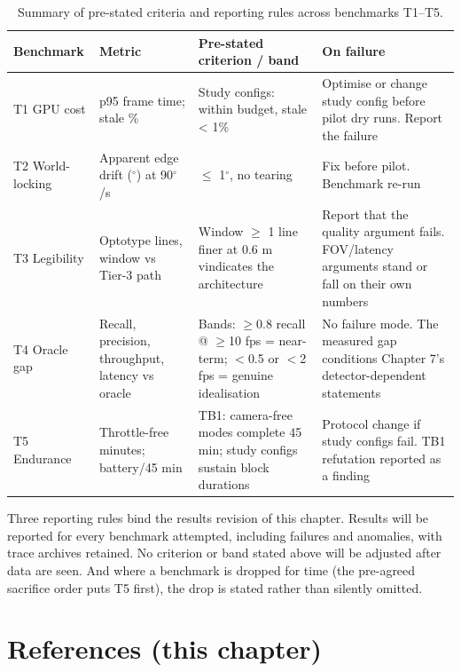 \begin{longtable}{p{}|p{}|p{}|p{}}
\caption{Summary of pre-stated criteria and reporting rules across benchmarks T1–T5.}\\
\hline
\textbf{Benchmark} & \textbf{Metric} & \textbf{Pre-stated criterion / band} & \textbf{On failure} \\
\hline
\endhead
\hline
T1 GPU cost & p95 frame time; stale \% & Study configs: within budget, stale < 1\% & Optimise or change study config before pilot dry runs. Report the failure \\
T2 World-locking & Apparent edge drift ($^{\circ}$) at 90$^{\circ}$/s & $\leq$ 1$^{\circ}$, no tearing & Fix before pilot. Benchmark re-run \\
T3 Legibility & Optotype lines, window vs Tier-3 path & Window $\geq$ 1 line finer at 0.6 m vindicates the architecture & Report that the quality argument fails. FOV/latency arguments stand or fall on their own numbers \\
T4 Oracle gap & Recall, precision, throughput, latency vs oracle & Bands: $\geq$0.8 recall @ $\geq$10 fps = near-term; $<$0.5 or $<$2 fps = genuine idealisation & No failure mode. The measured gap conditions Chapter 7's detector-dependent statements \\
T5 Endurance & Throttle-free minutes; battery/45 min & TB1: camera-free modes complete 45 min; study configs sustain block durations & Protocol change if study configs fail. TB1 refutation reported as a finding \\
\hline
\end{longtable}

Three reporting rules bind the results revision of this chapter. Results will be reported for every
benchmark attempted, including failures and anomalies, with trace archives retained. No criterion
or band stated above will be adjusted after data are seen. And where a benchmark is dropped for
time (the pre-agreed sacrifice order puts T5 first), the drop is
stated rather than silently omitted.

\section*{References (this chapter)}



